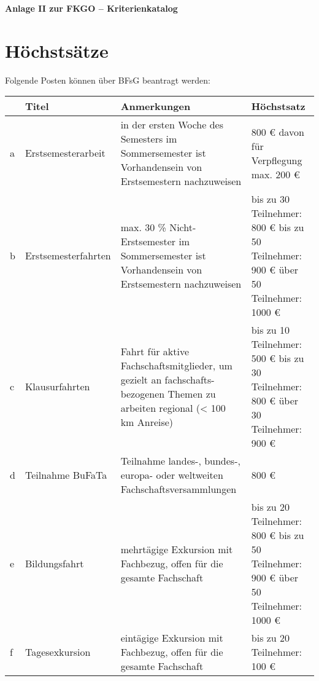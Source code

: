 \documentclass[11pt]{article}
\begin{document}
\noindent
\begin{center}
    \huge \textbf{Anlage II zur FKGO -- Kriterienkatalog}
\end{center}



\section{Höchstsätze}
Folgende Posten können über BFsG beantragt werden:\\
\begin{center}
\setlength\extrarowheight{2mm}
\sffamily
\begin{tabular}{l|L{4,5 cm}|L{5cm}|L{4,5cm}}
    &\textbf{Titel} & \textbf{Anmerkungen} & \textbf{Höchstsatz}\\ \hline
     a&Erstsemesterarbeit & in der ersten Woche des Semesters \newline im Sommersemester ist Vorhandensein von Erstsemestern nachzuweisen& 800 € \newline davon für Verpflegung max. 200 €\\ \hline
     b&Erstsemesterfahrten & max. 30 \% Nicht-Erstsemester \newline im Sommersemester ist Vorhandensein von Erstsemestern nachzuweisen & bis zu 30 Teilnehmer: 800 € \newline
     bis zu 50 Teilnehmer: 900 € \newline über 50 Teilnehmer: 1000 € \\ \hline
     c&Klausurfahrten & Fahrt für aktive Fachschaftsmitglieder, um gezielt an fachschafts- bezogenen Themen zu arbeiten \newline regional (< 100 km Anreise) & bis zu 10 Teilnehmer: 500 € \newline
     bis zu 30 Teilnehmer: 800 € \newline über 30 Teilnehmer: 900 € \\ \hline
     d&Teilnahme BuFaTa & Teilnahme landes-, bundes-, europa- oder weltweiten Fachschaftsversammlungen & 800 € \\ \hline
     e&Bildungsfahrt & mehrtägige Exkursion mit Fachbezug, offen für die gesamte Fachschaft & bis zu 20 Teilnehmer: 800 € \newline
     bis zu 50 Teilnehmer: 900 € \newline über 50 Teilnehmer: 1000 € \\ \hline
     f&Tagesexkursion & eintägige Exkursion mit Fachbezug, offen für die gesamte Fachschaft & bis zu 20 Teilnehmer: 100 € \newline

\end{tabular}
\end{center}
\end{document}
